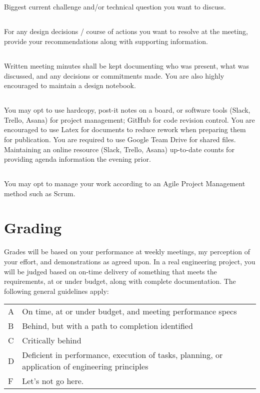 \documentclass[10pt,courier]{navymemo}
\begin{document}
\subsection{} Biggest current challenge and/or technical question you want to discuss.
\subsection{} For any design decisions / course of actions you want to resolve at the meeting, provide your recommendations along with supporting information.
\subsection{} Written meeting minutes shall be kept documenting who was present, what was discussed, and any decisions or commitments made.  You are also highly encouraged to maintain a design notebook. 
\subsection{} You may opt to use hardcopy, post-it notes on a board, or software tools (Slack, Trello, Asana) for project management; GitHub for code revision control. You are encouraged to use Latex for documents to reduce rework when preparing them for publication. You are required to use Google Team Drive for shared files. Maintaining an online resource (Slack, Trello, Asana) up-to-date counts for providing agenda information the evening prior. 
\subsection{} You may opt to manage your work according to an Agile Project Management method such as Scrum. 

\section{Grading}
Grades will be based on your performance at weekly meetings, my perception of your effort, and demonstrations as agreed upon.  In a real engineering project, you will be judged based on on-time delivery of something that meets the requirements, at or under budget, along with complete documentation. The following general guidelines apply: 
\begin{center}
\begin{tabular}{lp{5in}}
A & On time, at or under budget, and meeting performance specs \\
B & Behind, but with a path to completion identified \\
C & Critically behind \\
D & Deficient in performance, execution of tasks, planning, or application of engineering principles \\
F & Let's not go here. \\
\end{tabular}
\end{center}
\end{document}
